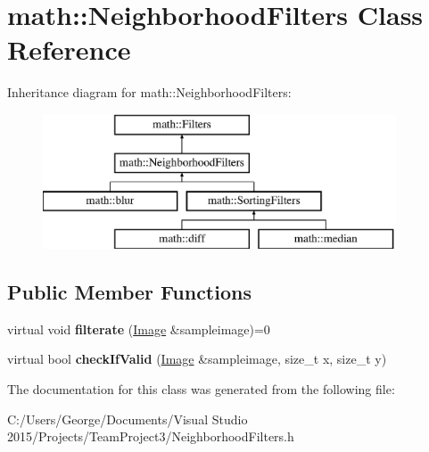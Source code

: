 \hypertarget{classmath_1_1_neighborhood_filters}{}\section{math\+:\+:Neighborhood\+Filters Class Reference}
\label{classmath_1_1_neighborhood_filters}
Inheritance diagram for math\+:\+:Neighborhood\+Filters\+:\begin{figure}[H]
\begin{center}
\leavevmode
\includegraphics[height=4.000000cm]{classmath_1_1_neighborhood_filters}
\end{center}
\end{figure}
\subsection*{Public Member Functions}
\begin{DoxyCompactItemize}
\item 
\mbox{\label{classmath_1_1_neighborhood_filters_a6a3e440fd09b3481a74f81de9627d3a2}} 
virtual void {\bfseries filterate} (\hyperlink{classmath_1_1_image}{Image} \&sampleimage)=0
\item 
\mbox{\label{classmath_1_1_neighborhood_filters_afe9f90299c1a6ff6ff758f03fa3c8931}} 
virtual bool {\bfseries check\+If\+Valid} (\hyperlink{classmath_1_1_image}{Image} \&sampleimage, size\+\_\+t x, size\+\_\+t y)
\end{DoxyCompactItemize}


The documentation for this class was generated from the following file\+:\begin{DoxyCompactItemize}
\item 
C\+:/\+Users/\+George/\+Documents/\+Visual Studio 2015/\+Projects/\+Team\+Project3/Neighborhood\+Filters.\+h\end{DoxyCompactItemize}
